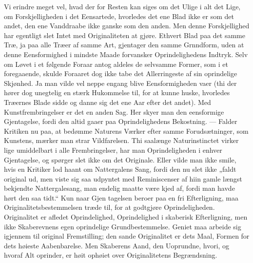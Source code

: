 \documentclass[12pt,a4paper]{book}
\begin{document}
Vi erindre meget vel, hvad der for Resten kan siges om det Ulige i alt det Lige,
om Forskjelligheden i det Eensartede, hvorledes det ene Blad ikke er som det
andet, den ene Vanddraabe ikke ganske som den anden. Men denne Forskjellighed har
egentligt slet Intet med Originaliteten at gjøre. Ethvert Blad paa det samme Træ,
ja paa alle Træer af samme Art, gjentager den samme Grnndform, uden at denne
Eensformighed i mindste Maade forvansker Oprindelighedens Indtryk. Selv om Løvet i
et følgende Foraar antog aldeles de selvsamme Former, som i et foregaaende, skulde
Foraaret dog ikke tabe det Allerringeste af sin oprindelige Skjønhed. Ja man vilde
vel neppe engang blive Eensformigheden vaer (thi der hører dog unegtelig en stærk
Hukommelse til, for at kunne huske, hvorledes Træernes Blade sidde og danne sig
det ene Aar efter det andet). Med Kunstfrembringelser er det en anden Sag. Her
skyer man den eensformige Gjentagelse, fordi den altid gaaer paa Oprindelighedens
Bekostning. --- Falder Kritiken nu paa, at bedømme Naturens Værker efter samme
Forudsætninger, som Kunstens, mærker man strar Vildfarelsen. Thi saalænge
Naturinstinctet virker lige umiddelbart i alle Frembringelser, har man
Oprindeligheden i enhver Gjentagelse, og spørger slet ikke om det Originale. Eller
vilde man ikke smile, hvis en Kritiker lod haant om Nattergalens Sang, fordi den
nu slet ikke „faldt original ud, men viste sig saa udpyntet med Reminiscenser af
hiin gamle længst bekjendte Nattergalesang, man endelig maatte være kjed af, fordi
man havde hørt den saa tidt.“ Kun naar Gjen\-%
tagelsen beroer paa en fri Efterligning, maa Originalitetsbestemmelsen træde til,
for at godtgjøre Oprindeligheden. Originalitet er afledet Oprindelighed,
Oprindelighed i skaberisk Efterligning, men ikke Skaberevnens egen oprindelige
Grundbestemmelse. Geniet maa arbeide sig igjennem til original Fremstilling; den
sande Originalitet er dets Maal, Formen for dets høieste Aabenbarelse. Men
Skaberens Aand, den Uoprundne, hvori, og hvoraf Alt oprinder, er høit ophøiet over
Originalitetens Begrændsning.
\end{document}
